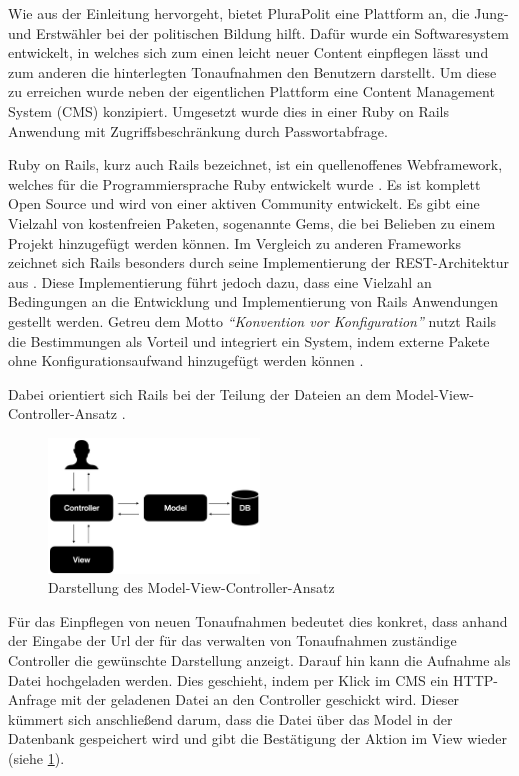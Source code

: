 Wie aus der Einleitung hervorgeht, bietet PluraPolit eine Plattform an, die Jung- und Erstwähler bei der politischen Bildung hilft. Dafür wurde ein Softwaresystem entwickelt, in welches sich zum einen leicht neuer Content einpflegen lässt und zum anderen die hinterlegten Tonaufnahmen den Benutzern darstellt. Um diese zu erreichen wurde neben der eigentlichen Plattform eine Content Management System (CMS) konzipiert. Umgesetzt wurde dies in einer Ruby on Rails Anwendung mit Zugriffsbeschränkung durch Passwortabfrage.

Ruby on Rails, kurz auch Rails bezeichnet, ist ein quellenoffenes Webframework, welches für die Programmiersprache Ruby entwickelt wurde \parencites[vgl.][S.4]{hartl_ruby_2016}{ruby_org}[vgl.][S. 24]{sieben_wochen}. Es ist komplett Open Source und wird von einer aktiven Community entwickelt. Es gibt eine Vielzahl von kostenfreien Paketen, sogenannte Gems, die bei Belieben zu einem Projekt hinzugefügt werden können. Im Vergleich zu anderen Frameworks zeichnet sich Rails besonders durch seine Implementierung der REST-Architektur aus \parencite[vgl.][S. 5]{hartl_ruby_2016}. Diese Implementierung führt jedoch dazu, dass eine Vielzahl an Bedingungen an die Entwicklung und Implementierung von Rails Anwendungen gestellt werden. Getreu dem Motto \textit{\enquote{Konvention vor Konfiguration}} nutzt Rails die Bestimmungen als Vorteil und integriert ein System, indem externe Pakete ohne Konfigurationsaufwand hinzugefügt werden können \parencite{ruby_doctrine}.

Dabei orientiert sich Rails bei der Teilung der Dateien an dem Model-View-Controller-Ansatz \parencites[vgl.][S. 66 ff.]{hartl_ruby_2016}.

\begin{figure}
	\centering
	\includegraphics[width=0.5\textwidth]{Assets/CMS_V1}
	\caption{Darstellung des Model-View-Controller-Ansatz}
	\label{fig:mvc-plurapolit}
\end{figure}

 Für das Einpflegen von neuen Tonaufnahmen bedeutet dies konkret, dass anhand der Eingabe der Url der für das verwalten von Tonaufnahmen zuständige Controller die gewünschte Darstellung anzeigt.
Darauf hin kann die Aufnahme als Datei hochgeladen werden. Dies geschieht, indem per Klick im CMS ein HTTP-Anfrage mit der geladenen Datei an den Controller geschickt wird. Dieser kümmert sich anschließend darum, dass die Datei über das Model in der Datenbank gespeichert wird und gibt die Bestätigung der Aktion im View wieder (siehe \cref{fig:mvc-plurapolit}).

